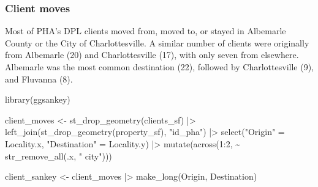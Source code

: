 \documentclass[
  letterpaper,
  DIV=11,
  numbers=noendperiod]{scrartcl}
\newenvironment{Shaded}{\begin{snugshade}}{\end{snugshade}}
\newcommand{\DecValTok}[1]{\textcolor[rgb]{0.68,0.00,0.00}{#1}}
\newcommand{\FunctionTok}[1]{\textcolor[rgb]{0.28,0.35,0.67}{#1}}
\newcommand{\NormalTok}[1]{\textcolor[rgb]{0.00,0.23,0.31}{#1}}
\newcommand{\OtherTok}[1]{\textcolor[rgb]{0.00,0.23,0.31}{#1}}
\newcommand{\SpecialCharTok}[1]{\textcolor[rgb]{0.37,0.37,0.37}{#1}}
\newcommand{\StringTok}[1]{\textcolor[rgb]{0.13,0.47,0.30}{#1}}
\begin{document}
\hypertarget{client-moves}{%
\subsubsection{Client moves}\label{client-moves}}

Most of PHA's DPL clients moved from, moved to, or stayed in Albemarle
County or the City of Charlottesville. A similar number of clients were
originally from Albemarle (20) and Charlottesville (17), with only seven
from elsewhere. Albemarle was the most common destination (22), followed
by Charlottesville (9), and Fluvanna (8).

\begin{Shaded}
\begin{Highlighting}[]
\FunctionTok{library}\NormalTok{(ggsankey)}

\NormalTok{client\_moves }\OtherTok{\textless{}{-}} \FunctionTok{st\_drop\_geometry}\NormalTok{(clients\_sf) }\SpecialCharTok{|\textgreater{}} 
  \FunctionTok{left\_join}\NormalTok{(}\FunctionTok{st\_drop\_geometry}\NormalTok{(property\_sf), }\StringTok{"id\_pha"}\NormalTok{) }\SpecialCharTok{|\textgreater{}} 
  \FunctionTok{select}\NormalTok{(}\StringTok{"Origin"} \OtherTok{=} \StringTok{\textquotesingle{}Locality.x\textquotesingle{}}\NormalTok{, }\StringTok{"Destination"} \OtherTok{=} \StringTok{\textquotesingle{}Locality.y\textquotesingle{}}\NormalTok{) }\SpecialCharTok{|\textgreater{}} 
  \FunctionTok{mutate}\NormalTok{(}\FunctionTok{across}\NormalTok{(}\DecValTok{1}\SpecialCharTok{:}\DecValTok{2}\NormalTok{, }\SpecialCharTok{\textasciitilde{}} \FunctionTok{str\_remove\_all}\NormalTok{(.x, }\StringTok{" city"}\NormalTok{)))}

\NormalTok{client\_sankey }\OtherTok{\textless{}{-}}\NormalTok{ client\_moves }\SpecialCharTok{|\textgreater{}} 
  \FunctionTok{make\_long}\NormalTok{(Origin, Destination)}


\end{Highlighting}
\end{Shaded}
\end{document}
